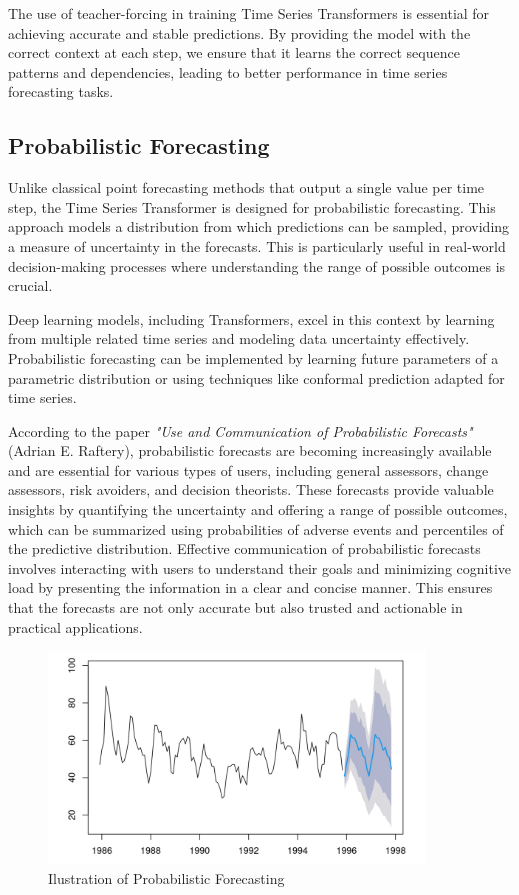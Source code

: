 The use of teacher-forcing in training Time Series Transformers is essential for achieving accurate and stable predictions. By providing the model with the correct context at each step, we ensure that it learns the correct sequence patterns and dependencies, leading to better performance in time series forecasting tasks.


\subsection{Probabilistic Forecasting}
Unlike classical point forecasting methods that output a single value per time step, the Time Series Transformer is designed for probabilistic forecasting. This approach models a distribution from which predictions can be sampled, providing a measure of uncertainty in the forecasts. This is particularly useful in real-world decision-making processes where understanding the range of possible outcomes is crucial.

Deep learning models, including Transformers, excel in this context by learning from multiple related time series and modeling data uncertainty effectively. Probabilistic forecasting can be implemented by learning future parameters of a parametric distribution or using techniques like conformal prediction adapted for time series.

According to the paper \textit{"Use and Communication of Probabilistic Forecasts"} (Adrian E. Raftery)\cite{raftery2014usecommunicationprobabilisticforecasts}, probabilistic forecasts are becoming increasingly available and are essential for various types of users, including general assessors, change assessors, risk avoiders, and decision theorists. These forecasts provide valuable insights by quantifying the uncertainty and offering a range of possible outcomes, which can be summarized using probabilities of adverse events and percentiles of the predictive distribution. Effective communication of probabilistic forecasts involves interacting with users to understand their goals and minimizing cognitive load by presenting the information in a clear and concise manner. This ensures that the forecasts are not only accurate but also trusted and actionable in practical applications.

\begin{figure}[htbp]
    \centering
    \includegraphics[width=10cm]{3_ChapterTranformerVariants/figuras/Probabilistic.png}
    \caption{Ilustration of Probabilistic Forecasting}
    \end{figure}





